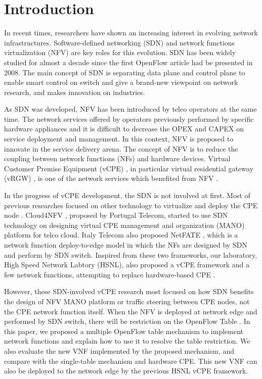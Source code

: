 \chapter{Introduction}
In recent times, researchers have shown an increasing interest in evolving network infrastructures. Software-defined networking (SDN) and network functions virtualization (NFV) are key roles for this evolution. SDN \cite{sdn-mckeown-2009-talk, sdn-newnorm, sdn-road, sdn-compre-survey} has been widely studied for almost a decade since the first OpenFlow \cite{openflow-mckeown-2008, openflow-spec} article had be presented in 2008. The main concept of SDN is separating data plane and control plane to enable smart control on switch and give a brand-new viewpoint on network research, and makes innovation on industries.

As SDN was developed, NFV \cite{nfv-wp, etsi-nfv-archi, nfv-survey} has been introduced by telco operators at the same time. The network services offered by operators previously performed by specific hardware appliances and it is difficult to decrease the OPEX and CAPEX on service deployment and management. In this context, NFV is proposed to innovate in the service delivery arena. The concept of NFV is to reduce the coupling between network functions (NFs) and hardware devices. Virtual Customer Premise Equipment (vCPE) \cite{nec-vcpe, vcpe-enhance}, in particular virtual residential gateway (vRGW) \cite{nfv-home}, is one of the network services which benefited from NFV \cite{etsi-nfv-usecase}.

In the progress of vCPE development, the SDN is not involved at first. Most of previous researches focused on other technology to virtualize and deploy the CPE node \cite{virtual-rg, security-vgw, design-vrgw, nfv-hgw-surrogate, linux-cpe, nfv-resoure-contrain-cpe}.
Cloud4NFV \cite{cloud4nfv, cloud4nfv-telco}, proposed by Portugal Telecom, started to use SDN technology on designing virtual CPE management and organization (MANO) platform for telco cloud. Italy Telecom also proposed NetFATE \cite{netfate}, which is a network function deploy-to-edge model in which the NFs are designed by SDN and perform by SDN switch. Inspired from these two frameworks, our laboratory, High Speed Network Labtory (HSNL), also proposed a vCPE framework and a few network functions, attempting to replace hardware-based CPE \cite{che-wei-master, che-wei-umedia}.

However, these SDN-involved vCPE research most focused on how SDN benefits the design of NFV MANO \cite{etsi-nfv-mano, etsi-nfv-mano-sdn} platform or traffic steering between CPE nodes, not the CPE network function itself. When the NFV is deployed at network edge and performed by SDN switch, there will be restriction on the OpenFlow Table \cite{multiple-flow-table}. In this paper, we proposed a multiple OpenFlow table mechanism to implement network functions and explain how to use it to resolve the table restriction. We also evaluate the new VNF implemented by the proposed mechanism, and compare with the single-table mechanism and hardware CPE. This new VNF can also be deployed to the network edge by the previous HSNL vCPE framework.

